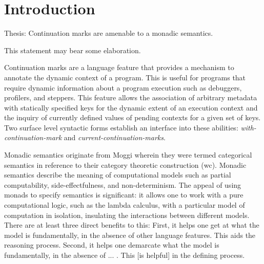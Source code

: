 \documentclass[ms]{byuprop}
\title{\Title}
\author{\Author}
\begin{document}
\maketitle



\section{Introduction}


Thesis: Continuation marks are amenable to a monadic semantics.

This statement may bear some elaboration. 

Continuation marks are a language feature that provides a mechanism to annotate the dynamic context of a program. This is useful for programs that require dynamic information about a program execution such as debuggers, profilers, and steppers.
This feature allows the association of arbitrary metadata with statically specified keys for the dynamic extent of an execution context and the inquiry of currently defined values of pending contexts for a given set of keys. Two surface level syntactic forms establish 
an interface into these abilities: \emph{with-continuation-mark} and \emph{current-continuation-marks}.

Monadic semantics originate from Moggi \cite{moggi1989computational} wherein they were termed categorical semantics in reference to their category theoretic construction (wc). Monadic semantics describe the meaning of computational models such as partial computability, side-effectfulness, and non-determinism. The appeal of using monads to specify semantics is significant: it allows one to work with a pure computational logic, such as the lambda calculus, with a particular model of computation in isolation, insulating the interactions between different models. There are at least three direct benefits to this: First, it helps one get at what the model is fundamentally, in the absence of other language features. This aids the reasoning process. Second, it helps one demarcate what the model is fundamentally, in the absence of ... . This [is helpful] in the defining process.

\end{document}
